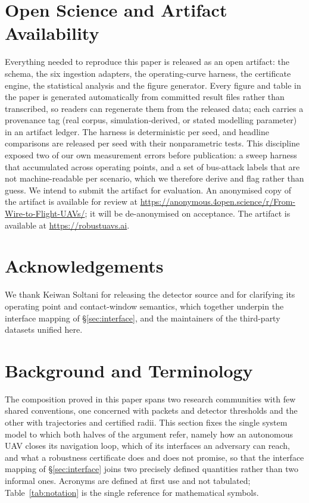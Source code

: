 \section{Open Science and Artifact Availability}
\label{sec:openscience}
Everything needed to reproduce this paper is released as an open artifact: the
schema, the six ingestion adapters, the operating-curve harness, the certificate
engine, the statistical analysis and the figure generator. Every figure and
table in the paper is generated automatically from committed result files rather
than transcribed, so readers can regenerate them from the released data; each
carries a provenance tag (real corpus, simulation-derived, or stated modelling
parameter) in an artifact ledger. The harness is deterministic per seed,
and headline comparisons are released per seed with their
nonparametric tests. This discipline exposed two of our own measurement errors
before publication: a sweep harness that accumulated across operating points,
and a set of bus-attack labels that are not machine-readable per scenario, which
we therefore derive and flag rather than guess. We intend to submit the artifact for evaluation.
\ifanon
An anonymised copy of the artifact is available for review at
\url{https://anonymous.4open.science/r/From-Wire-to-Flight-UAVs/}; it will be
de-anonymised on acceptance.
\else
The artifact is available at \url{https://robustuavs.ai}.
\fi

\ifanon\else

\section*{Acknowledgements}
We thank Keiwan Soltani for releasing the  detector source and
for clarifying its operating point and contact-window semantics, which together
underpin the interface mapping of \S\ref{sec:interface}, and the maintainers of
the third-party datasets unified here.
\fi




\appendix

\section{Background and Terminology}
\label{sec:background}
The composition proved in this paper spans two research communities with few
shared conventions, one concerned with packets and detector thresholds and the
other with trajectories and certified radii. This section fixes the single
system model to which both halves of the argument refer, namely how an
autonomous UAV closes its navigation loop, which of its interfaces an adversary
can reach, and what a robustness certificate does and does not promise, so that
the interface mapping of \S\ref{sec:interface} joins two precisely defined
quantities rather than two informal ones. Acronyms are defined at first use and
not tabulated; Table~\ref{tab:notation} is the single reference for
mathematical symbols.

